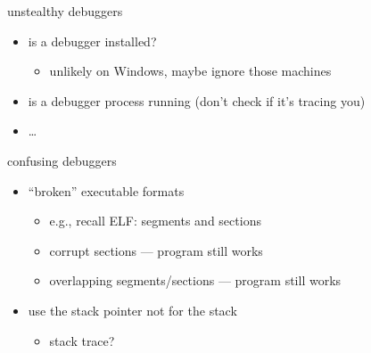 
\begin{frame}[fragile,label=unstealthyDebuggers]{unstealthy debuggers}
    \begin{itemize}
    \item is a debugger installed?
        \begin{itemize}
        \item unlikely on Windows, maybe ignore those machines
        \end{itemize}
    \item is a debugger process running (don't check if it's tracing you)
    \item \ldots
    \end{itemize}
\end{frame}

\begin{frame}{confusing debuggers}
    \begin{itemize}
    \item ``broken'' executable formats
        \begin{itemize}
        \item e.g., recall ELF: segments and sections
        \item corrupt sections --- program still works
        \item overlapping segments/sections --- program still works
        \end{itemize}
    \item use the stack pointer not for the stack
        \begin{itemize}
        \item stack trace?
        \end{itemize}
    \end{itemize}
\end{frame}
